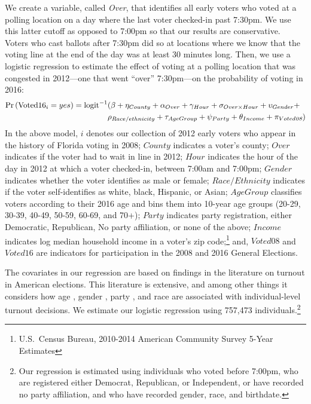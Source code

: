 \documentclass[12pt,titlepage]{article}
\begin{document}
We create a variable, called \emph{Over}, that identifies all early
voters who voted at a polling location on a day where the last voter
checked-in past 7:30pm. We use this latter cutoff as opposed to 7:00pm
so that our results are conservative. Voters who cast ballots after
7:30pm did so at locations where we know that the voting line at the
end of the day was at least 30 minutes long. Then, we use a logistic
regression to estimate the effect of voting at a polling location that
was congested in 2012---one that went ``over'' 7:30pm---on the
probability of voting in 2016: \begin{equation*}
  \begin{aligned}
    \textup{Pr}\left(\mathrm{Voted16}_{i} = yes\right) =
    \textup{logit}^{-1}&(\beta + \eta_{County} + \alpha_{Over} + \gamma_{Hour} +
    \sigma_{Over \times Hour} + \upsilon_{Gender}  + \\& \rho_{Race/ethnicity} +
      \tau_{Age Group} + \psi_{Party} + \theta_{Income} + \pi_{Voted\emph{08}})
  \end{aligned}  
\end{equation*}
%
In the above model, $i$ denotes our collection of 2012 early voters
who appear in the history of Florida voting in 2008; $County$
indicates a voter's county; $Over$ indicates if the voter had to wait
in line in 2012; $Hour$ indicates the hour of the day in 2012 at which
a voter checked-in, between 7:00am and 7:00pm; $Gender$ indicates
whether the voter identifies as male or female; $Race/Ethnicity$
indicates if the voter self-identifies as white, black, Hispanic, or
Asian; $Age Group$ classifies voters according to their 2016 age and
bins them into 10-year age groups (20-29, 30-39, 40-49, 50-59, 60-69,
and 70+); $Party$ indicates party registration, either Democratic,
Republican, No party affiliation, or none of the above; $Income$
indicates log median household income in a voter's zip
code;\footnote{U.S.\ Census Bureau, 2010-2014 American Community
  Survey 5-Year Estimates} and, $Voted08$ and $Voted16$ are indicators
for participation in the 2008 and 2016 General Elections.

The covariates in our regression are based on findings in the
literature on turnout in American elections. This literature is
extensive, and among other things it considers how age
\citep{strateetal:age,hightonwolfinger:lifecycle}, gender
\citep{schlozman:genderdifferentvoice}, party
\citep{martinezgill:partisanturnout,grofmanetal:turnout}, and race
\citep{verbaetal:raceparticipation,fraga:raceturnout} are associated
with individual-level turnout decisions. We estimate our logistic
regression using 757,473 individuals.\footnote{Our regression is
  estimated using individuals who voted before 7:00pm, who are
  registered  either Democrat, Republican, or Independent, or have recorded no
  party affiliation, and who have recorded gender, race, and
  birthdate.}
\end{document}
